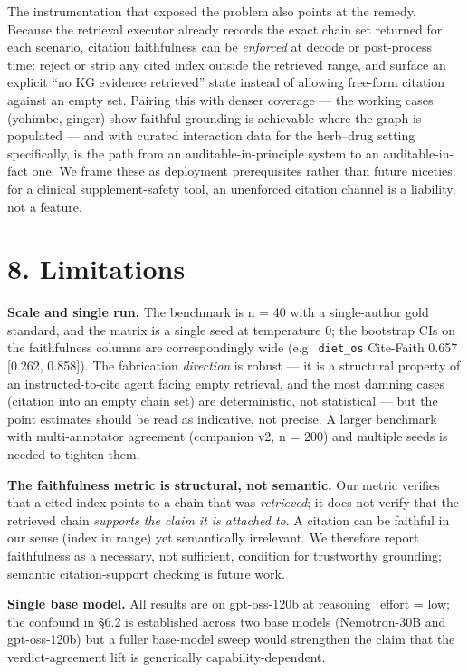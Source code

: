 \documentclass[
]{article}
\begin{document}
The instrumentation that exposed the problem also points at the remedy.
Because the retrieval executor already records the exact chain set
returned for each scenario, citation faithfulness can be \emph{enforced}
at decode or post-process time: reject or strip any cited index outside
the retrieved range, and surface an explicit ``no KG evidence
retrieved'' state instead of allowing free-form citation against an
empty set. Pairing this with denser coverage --- the working cases
(yohimbe, ginger) show faithful grounding is achievable where the graph
is populated --- and with curated interaction data for the herb--drug
setting specifically, is the path from an auditable-in-principle system
to an auditable-in-fact one. We frame these as deployment prerequisites
rather than future niceties: for a clinical supplement-safety tool, an
unenforced citation channel is a liability, not a feature.

\hypertarget{limitations}{%
\section{8. Limitations}\label{limitations}}

\textbf{Scale and single run.} The benchmark is n = 40 with a
single-author gold standard, and the matrix is a single seed at
temperature 0; the bootstrap CIs on the faithfulness columns are
correspondingly wide (e.g.~\texttt{diet\_os} Cite-Faith 0.657 {[}0.262,
0.858{]}). The fabrication \emph{direction} is robust --- it is a
structural property of an instructed-to-cite agent facing empty
retrieval, and the most damning cases (citation into an empty chain set)
are deterministic, not statistical --- but the point estimates should be
read as indicative, not precise. A larger benchmark with multi-annotator
agreement (companion v2, n = 200) and multiple seeds is needed to
tighten them.

\textbf{The faithfulness metric is structural, not semantic.} Our metric
verifies that a cited index points to a chain that was \emph{retrieved};
it does not verify that the retrieved chain \emph{supports the claim it
is attached to}. A citation can be faithful in our sense (index in
range) yet semantically irrelevant. We therefore report faithfulness as
a necessary, not sufficient, condition for trustworthy grounding;
semantic citation-support checking is future work.

\textbf{Single base model.} All results are on gpt-oss-120b at
reasoning\_effort = low; the confound in §6.2 is established across two
base models (Nemotron-30B and gpt-oss-120b) but a fuller base-model
sweep would strengthen the claim that the verdict-agreement lift is
generically capability-dependent.
\end{document}

